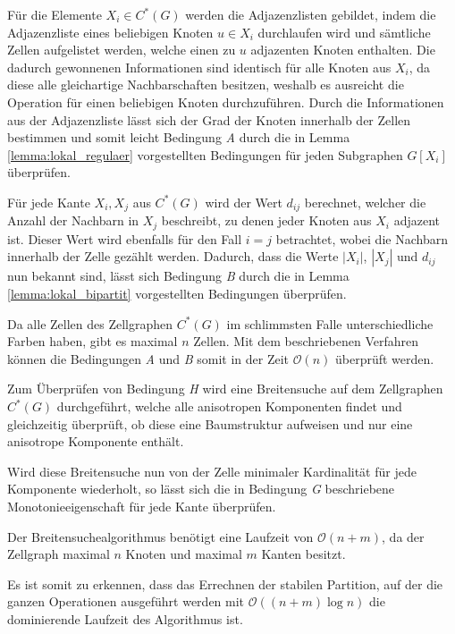 Für die Elemente $X_i\in C^*(G)$ werden die Adjazenzlisten gebildet, indem die Adjazenzliste eines beliebigen Knoten $u\in X_i$ durchlaufen wird und sämtliche Zellen aufgelistet werden, welche einen zu $u$ adjazenten Knoten enthalten.
Die dadurch gewonnenen Informationen sind identisch für alle Knoten aus $X_i$, da diese alle gleichartige Nachbarschaften besitzen, weshalb es ausreicht die Operation für einen beliebigen Knoten durchzuführen.
Durch die Informationen aus der Adjazenzliste lässt sich der Grad der Knoten innerhalb der Zellen bestimmen und somit leicht Bedingung \emph{A} durch die in Lemma \ref{lemma:lokal_regulaer} vorgestellten Bedingungen für jeden Subgraphen $G[X_i]$ überprüfen.

Für jede Kante ${X_i,X_j}$ aus $C^*(G)$ wird der Wert $d_{ij}$ berechnet, welcher die Anzahl der Nachbarn in $X_j$ beschreibt, zu denen jeder Knoten aus $X_i$ adjazent ist.
Dieser Wert wird ebenfalls für den Fall $i=j$ betrachtet, wobei die Nachbarn innerhalb der Zelle gezählt werden.
Dadurch, dass die Werte $|X_i|$, $|X_j|$ und $d_{ij}$ nun bekannt sind, lässt sich Bedingung \emph{B} durch die in Lemma \ref{lemma:lokal_bipartit} vorgestellten Bedingungen überprüfen.

Da alle Zellen des Zellgraphen $C^*(G)$ im schlimmsten Falle unterschiedliche Farben haben, gibt es maximal $n$ Zellen.
Mit dem beschriebenen Verfahren können die Bedingungen \emph{A} und \emph{B} somit in der Zeit $\mathcal{O}(n)$ überprüft werden.

Zum Überprüfen von Bedingung \emph{H} wird eine Breitensuche auf dem Zellgraphen $C^*(G)$ durchgeführt, welche alle anisotropen Komponenten findet und gleichzeitig überprüft, ob diese eine Baumstruktur aufweisen und nur eine anisotrope Komponente enthält.

Wird diese Breitensuche nun von der Zelle minimaler Kardinalität für jede Komponente wiederholt, so lässt sich die in Bedingung \emph{G} beschriebene Monotonieeigenschaft für jede Kante überprüfen.

Der Breitensuchealgorithmus benötigt eine Laufzeit von $\mathcal{O}(n+m)$, da der Zellgraph maximal $n$ Knoten und maximal $m$ Kanten besitzt.

Es ist somit zu erkennen, dass das Errechnen der stabilen Partition, auf der die ganzen Operationen ausgeführt werden mit $\mathcal{O}((n+m)\log n)$ die dominierende Laufzeit des Algorithmus ist.
